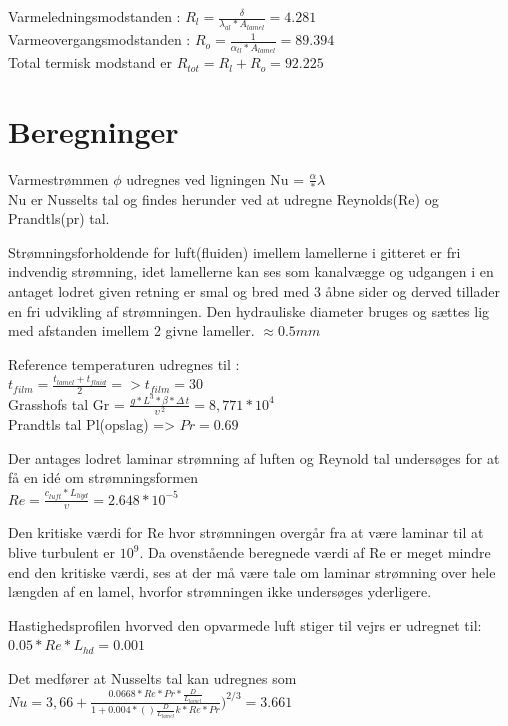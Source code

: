 Varmeledningsmodstanden : $R_l = \frac{\delta}{\lambda_{al}*A_{lamel}} = 4.281$ \\
Varmeovergangsmodstanden : $R_o = \frac{1}{\alpha_{tl}*A_{lamel}} = 89.394$ \\

Total termisk modstand er $R_{tot} = R_l + R_o = 92.225$ \\

\section{Beregninger}

Varmestrømmen $\phi$ udregnes ved ligningen Nu = $\frac{\alpha}*{\lambda}$ \\
Nu er Nusselts tal og findes herunder ved at udregne Reynolds(Re) og Prandtls(pr) tal.

Strømningsforholdende for luft(fluiden) imellem lamellerne i gitteret er fri indvendig strømning, idet lamellerne kan ses som kanalvægge og udgangen i en antaget lodret given retning er smal og bred med 3 åbne sider og derved tillader en fri udvikling af strømningen. Den hydrauliske diameter bruges og sættes lig med afstanden imellem 2 givne lameller. $\approx 0.5 mm$

Reference temperaturen udregnes til : 
\\$t_{film} = \frac{{t_{lamel}}+t_{fluid}}{2} => t_{film}=30$
\\Grasshofs tal Gr = $\frac{g*L^3*\beta*{\Delta\,t}}{\upsilon\,^2} = 8,771*10^4$
\\Prandtls tal Pl(opslag) => $Pr=0.69$

Der antages lodret laminar strømning af luften og Reynold tal undersøges for at få en idé om strømningsformen\\

$Re = \frac{c_{luft}*L_{hyd}}{\upsilon} = 2.648*10^{-5}$

Den kritiske værdi for Re hvor strømningen overgår fra at være laminar til at blive turbulent er $10^9$.  Da ovenstående beregnede værdi af Re er meget mindre end den kritiske værdi, ses at der må være tale om laminar strømning over hele længden af en lamel, hvorfor strømningen ikke undersøges yderligere.

Hastighedsprofilen hvorved den opvarmede luft stiger til vejrs er udregnet til: 
$0.05*Re*L_{hd} = 0.001 $

Det medfører at Nusselts tal kan udregnes som \\ 
$Nu = 3,66+ \frac{0.0668*Re*Pr*\frac{D}{L_{lamel}}}{1+0.004*()\frac{D}{L_{lamel}}k *Re*Pr})^{2/3} = 3.661$


